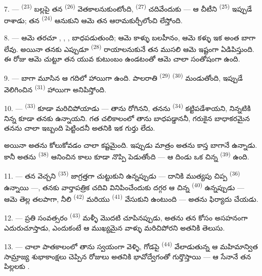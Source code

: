 7. ---  \textsuperscript{(23)} బల్లపై తన 
\textsuperscript{(26)} వెతకాలనుకుంటోంది,  \textsuperscript{(27)} చదివేందుకు
— ఆ చీటీని  \textsuperscript{(25)} ఇప్పుడే రాశాడు; తన 
\textsuperscript{(24)} ఆనుకుని ఆమె తన ఆరామకుర్చీలోంచి లేస్తోంది.

8. --- ఆమె తరచూ , , ,
 బాధపడుతుంది; ఆమె కాళ్ళు బలహీనం, ఆమె కళ్ళు ఇక అంత బాగా లేవు. అయినా తనకు
ఎప్పుడూ  \textsuperscript{(28)} రాయాలనుకునే తన ముసలి  ఆమె
ఇష్టంగా ఏడిపిస్తుంది. ఈ రోజు ఆమె చుట్టూ తన యువ కుటుంబం ఉండటంతో ఆమె చాలా సంతోషంగా ఉంది.

9. --- బాగా మూసిన ఆ గదిలో హాయిగా ఉంది. పాలరాతి  \textsuperscript{(29)}
 \textsuperscript{(30)} మండుతోంది, ఇప్పుడే వెలిగించిన 
\textsuperscript{(31)}  హాయిగా అనిపిస్తోంది.

\VUsaut{4.2mm}
\VUsaut{3.0mm}

10. ---  \textsuperscript{(33)} కూడా మరిచిపోయాడు — తాను రోగినని,
 తనను  \textsuperscript{(34)} కట్టిపడేశాయని,
నిన్నటికి నిన్న కూడా తనకు  ఉన్నాయని. గత చలికాలంలో తాను
 బాధపడ్డాననీ, గరుకైన బాధాకరమైన  తనను చాలా ఇబ్బంది
పెట్టిందనీ అతనికి ఇక గుర్తు లేదు.

అయినా అతను కోలుకోవడం చాలా కష్టమైంది. ఇప్పుడు మాత్రం అతను కాస్త బాగానే ఉన్నాడు. కానీ అతను
 \textsuperscript{(38)} ఆనించిన కాలు కూడా నొప్పి పెడుతోంది — ఆ దిండు ఒక చిన్న
 \textsuperscript{(39)} ఉంది.

11. --- తన వెచ్చని  \textsuperscript{(35)} జాగ్రత్తగా చుట్టుకుని
ఉన్నప్పుడు — దానికి ముత్యపు చిప్ప  \textsuperscript{(36)} ఉన్నాయి —, తనకు
వార్తాపత్రిక చదివి వినిపించేందుకు దగ్గర ఆ చిన్న  \textsuperscript{(40)}
ఉన్నప్పుడు — ఆమె తెల్ల తలపాగా, నీలి  \textsuperscript{(42)} మరియు
 \textsuperscript{(41)} వేసుకుని ఉంటుంది — అతను ఫిర్యాదు చేయడు.

12. --- ప్రతి సంవత్సరం  \textsuperscript{(43)} మళ్ళీ 
మొదటి  చూపినప్పుడు, అతను తన  కోసం అసహనంగా ఎదురుచూస్తాడు,
ఎందుకంటే ఆ ముఖ్యమైన  వాళ్ళు మరిచిపోరని అతనికి తెలుసు.

13. --- చాలా పాతకాలంలో తాను స్వయంగా వెళ్ళి, గోడపై  \textsuperscript{(44)}
వేలాడుతున్న ఆ మహిమాన్విత సామ్రాజ్య  శుభాకాంక్షలు చెప్పిన రోజులు అతనికి
భావోద్వేగంతో గుర్తొస్తాయి — ఆ సేనానే తన పిల్లలకు .

\VUsaut{6.0mm}
\VUfilet{22mm}
